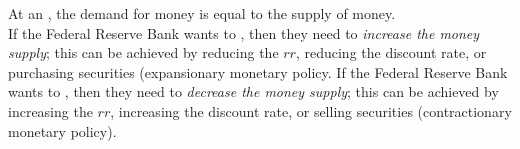 \documentclass{article}
\begin{document}
At an , the demand for money is equal to the supply of money. \\ 

If the Federal Reserve Bank wants to , then they need to \emph{increase the money supply}; this can be achieved by reducing the $rr$, reducing the discount rate, or purchasing securities (expansionary monetary policy. If the Federal Reserve Bank wants to , then they need to \emph{decrease the money supply}; this can be achieved by increasing the $rr$, increasing the discount rate, or selling securities (contractionary monetary policy). 
\end{document}

